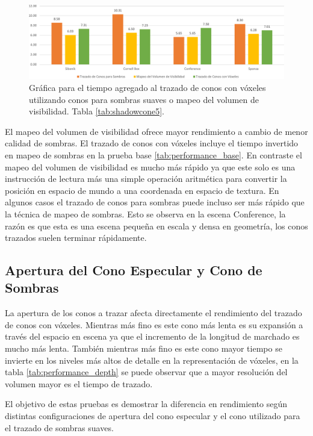 \begin{figure}[H]
	\centering
	\includegraphics[width=0.95\linewidth]{media/shadowtrace_time_cropped.pdf}
	\caption{Gráfica para el tiempo agregado al trazado de conos con vóxeles utilizando conos para sombras suaves o mapeo del volumen de visibilidad. Tabla \ref{tab:shadowcone5}.}
	\label{fig:voxeltrace_shadowing}
\end{figure}

El mapeo del volumen de visibilidad ofrece mayor rendimiento a cambio de menor calidad de sombras. El trazado de conos con vóxeles incluye el tiempo invertido en mapeo de sombras en la prueba base \ref{tab:performance_base}. En contraste el mapeo del volumen de visibilidad es mucho más rápido ya que este solo es una instrucción de lectura más una simple operación aritmética para convertir la posición en espacio de mundo a una coordenada en espacio de textura. En algunos casos el trazado de conos para sombras puede incluso ser más rápido que la técnica de mapeo de sombras. Esto se observa en la escena Conference, la razón es que esta es una escena pequeña en escala y densa en geometría, los conos trazados suelen terminar rápidamente.

\subsection{Apertura del Cono Especular y Cono de Sombras}

La apertura de los conos a trazar afecta directamente el rendimiento del trazado de conos con vóxeles. Mientras más fino es este cono más lenta es su expansión a través del espacio en escena ya que el incremento de la longitud de marchado es mucho más lenta. También mientras más fino es este cono mayor tiempo se invierte en los niveles más altos de detalle en la representación de vóxeles, en la tabla \ref{tab:performance_depth} se puede observar que a mayor resolución del volumen mayor es el tiempo de trazado.

El objetivo de estas pruebas es demostrar la diferencia en rendimiento según distintas configuraciones de apertura del cono especular y el cono utilizado para el trazado de sombras suaves.

